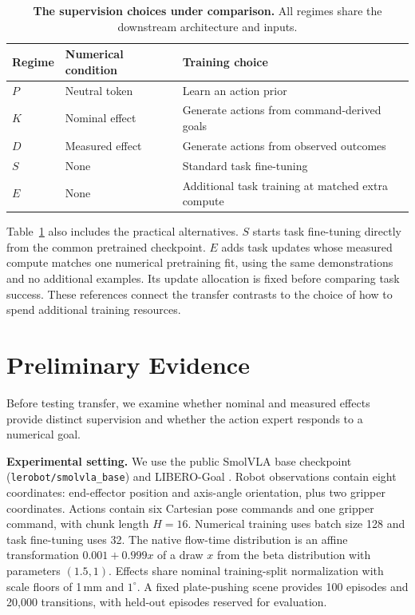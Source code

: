 \documentclass[conference]{IEEEtran}
\begin{document}
\begin{table}[t]
\caption{\textbf{The supervision choices under comparison.} All regimes share the downstream architecture and inputs.}
\label{tab:arms}
\centering
\footnotesize
\begin{tabular}{@{}p{.88cm}p{2.70cm}p{3.73cm}@{}}
\toprule
Regime & Numerical condition & Training choice\\
\midrule
$P$ & Neutral token & Learn an action prior\\
$K$ & Nominal effect & Generate actions from command-derived goals\\
$D$ & Measured effect & Generate actions from observed outcomes\\
$S$ & None & Standard task fine-tuning\\
$E$ & None & Additional task training at matched extra compute\\
\bottomrule
\end{tabular}
\end{table}

Table~\ref{tab:arms} also includes the practical alternatives. $S$ starts task fine-tuning directly from the common pretrained checkpoint. $E$ adds task updates whose measured compute matches one numerical pretraining fit, using the same demonstrations and no additional examples. Its update allocation is fixed before comparing task success. These references connect the transfer contrasts to the choice of how to spend additional training resources.

\section{Preliminary Evidence}
\label{sec:preliminary}
Before testing transfer, we examine whether nominal and measured effects provide distinct supervision and whether the action expert responds to a numerical goal.

\textbf{Experimental setting.} We use the public SmolVLA base checkpoint (\texttt{lerobot/smolvla\_base}) \citep{shukor2025smolvla} and LIBERO-Goal \citep{liu2023libero}. Robot observations contain eight coordinates: end-effector position and axis-angle orientation, plus two gripper coordinates. Actions contain six Cartesian pose commands and one gripper command, with chunk length $H=16$. Numerical training uses batch size 128 and task fine-tuning uses 32. The native flow-time distribution is an affine transformation $0.001+0.999x$ of a draw $x$ from the beta distribution with parameters $(1.5,1)$. Effects share nominal training-split normalization with scale floors of 1\,mm and $1^\circ$. A fixed plate-pushing scene provides 100 episodes and 20,000 transitions, with held-out episodes reserved for evaluation.
\end{document}
